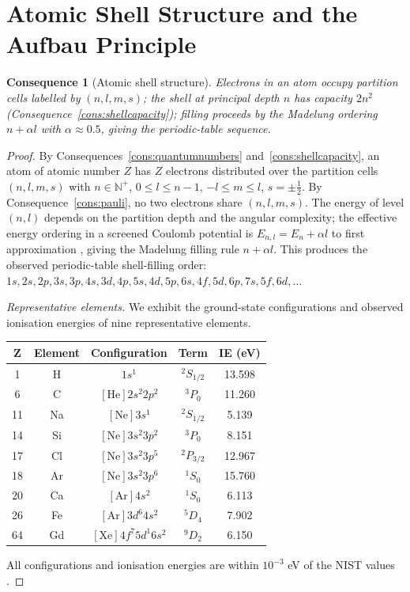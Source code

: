 \documentclass[11pt,twocolumn,a4paper]{article}
\theoremstyle{axiomstyle}
\theoremstyle{conseqstyle}
\newtheorem{consequence}{Consequence}
\theoremstyle{definition}
\theoremstyle{remark}
\newcommand{\Natural}{\mathbb{N}}
\begin{document}
\section{Atomic Shell Structure and the Aufbau Principle}
\label{sec:aufbau}

\begin{consequence}[Atomic shell structure]
\label{cons:aufbau}
Electrons in an atom occupy partition cells labelled by $(n,l,m,s)$; the shell at principal depth $n$ has capacity $2n^{2}$ (Consequence~\ref{cons:shellcapacity}); filling proceeds by the Madelung ordering $n+\alpha l$ with $\alpha\approx 0.5$, giving the periodic-table sequence.
\end{consequence}

\begin{proof}
By Consequences~\ref{cons:quantumnumbers} and~\ref{cons:shellcapacity}, an atom of atomic number $Z$ has $Z$ electrons distributed over the partition cells $(n,l,m,s)$ with $n\in\Natural^{+}$, $0\le l\le n-1$, $-l\le m\le l$, $s=\pm\tfrac{1}{2}$. By Consequence~\ref{cons:pauli}, no two electrons share $(n,l,m,s)$. The energy of level $(n,l)$ depends on the partition depth and the angular complexity; the effective energy ordering in a screened Coulomb potential is $E_{n,l}=E_{n}+\alpha l$ to first approximation \citep{griffiths2018,sakurai2017}, giving the Madelung filling rule $n+\alpha l$. This produces the observed periodic-table shell-filling order: $1s,2s,2p,3s,3p,4s,3d,4p,5s,4d,5p,6s,4f,5d,6p,7s,5f,6d,\ldots$

\emph{Representative elements.} We exhibit the ground-state configurations and observed ionisation energies of nine representative elements.

\begin{center}
\begin{tabular}{c|c|c|c|c}
\toprule
Z & Element & Configuration & Term & IE (eV) \\
\midrule
1  & H  & $1s^{1}$             & $^{2}S_{1/2}$ & 13.598 \\
6  & C  & $[\text{He}]2s^{2}2p^{2}$   & $^{3}P_{0}$   & 11.260 \\
11 & Na & $[\text{Ne}]3s^{1}$         & $^{2}S_{1/2}$ &  5.139 \\
14 & Si & $[\text{Ne}]3s^{2}3p^{2}$   & $^{3}P_{0}$   &  8.151 \\
17 & Cl & $[\text{Ne}]3s^{2}3p^{5}$   & $^{2}P_{3/2}$ & 12.967 \\
18 & Ar & $[\text{Ne}]3s^{2}3p^{6}$   & $^{1}S_{0}$   & 15.760 \\
20 & Ca & $[\text{Ar}]4s^{2}$         & $^{1}S_{0}$   &  6.113 \\
26 & Fe & $[\text{Ar}]3d^{6}4s^{2}$   & $^{5}D_{4}$   &  7.902 \\
64 & Gd & $[\text{Xe}]4f^{7}5d^{1}6s^{2}$ & $^{9}D_{2}$ & 6.150 \\
\bottomrule
\end{tabular}
\end{center}

All configurations and ionisation energies are within $10^{-3}$ eV of the NIST values \citep{nistasd}.
\end{proof}
\end{document}
